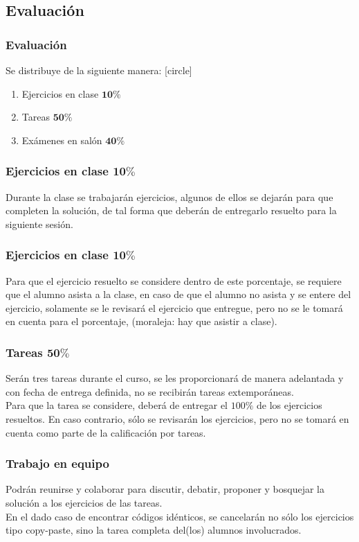 \documentclass[12pt]{beamer}
\begin{document}
\subsection{Evaluación}
\begin{frame}
\frametitle{Evaluación}
Se distribuye de la siguiente manera:
[circle]
\begin{enumerate}[<+->]
\item Ejercicios en clase $\mathbf{10\%}$
\item Tareas $\mathbf{50\%}$
\item Exámenes en salón $\mathbf{40\%}$
\end{enumerate}
\end{frame}
\begin{frame}
\frametitle{Ejercicios en clase $\mathbf{10\%}$}
Durante la clase se trabajarán ejercicios, algunos de ellos se dejarán para que completen la solución, de tal forma que deberán de entregarlo resuelto para la siguiente sesión.
\end{frame}
\begin{frame}
\frametitle{Ejercicios en clase $\mathbf{10\%}$}
Para que el ejercicio resuelto se considere dentro de este porcentaje, se requiere que el alumno asista a la clase, en caso de que el alumno no asista y se entere del ejercicio, solamente se le revisará el ejercicio que entregue, pero no se le tomará en cuenta para el porcentaje, (moraleja: hay que asistir a clase).
\end{frame}
\begin{frame}
\frametitle{Tareas $\mathbf{50\%}$}
Serán tres tareas durante el curso, se les proporcionará de manera adelantada y con fecha de entrega definida, no se recibirán tareas extemporáneas. 
\\
\bigskip
\pause
Para que la tarea se considere, deberá de entregar el $100\%$ de los ejercicios resueltos. En caso contrario, sólo se revisarán los ejercicios, pero no se tomará en cuenta como parte de la calificación por tareas.
\end{frame}
\begin{frame}
\frametitle{Trabajo en equipo}
Podrán reunirse y colaborar para discutir, debatir, proponer y bosquejar la solución a los ejercicios de las tareas.
\\
\bigskip
En el dado caso de encontrar códigos idénticos, se cancelarán no sólo los ejercicios tipo copy-paste, sino la tarea completa del(los) alumnos involucrados.
\end{frame}
\end{document}
